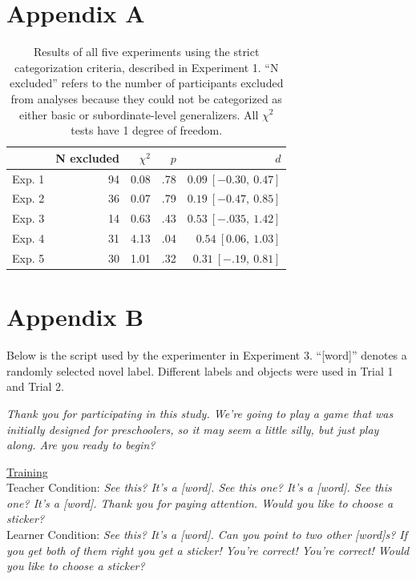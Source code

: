 \documentclass[man]{apa2}
\begin{document}
\section{Appendix A}

\begin{table}[h]
\centering
\begin{tabular}{rrrrr}
 \hline
 & N excluded & $\chi^2$ & $p$ & $d$ \\ 
 \hline
Exp. 1 & 94 & 0.08 & .78 & $0.09\ [-0.30,\ 0.47]$\\ 
Exp. 2 & 36 & 0.07 & .79 & $0.19\ [-0.47,\ 0.85]$ \\ 
Exp. 3 & 14 & 0.63 & .43 & $0.53\ [-.035,\ 1.42]$ \\ 
Exp. 4 & 31 & 4.13 & .04 & $0.54\ [0.06,\ 1.03]$\\ 
Exp. 5 & 30 & 1.01 & .32 & $0.31\ [-.19,\ 0.81]$\\ 
 \hline
\end{tabular}
\caption{Results of all five experiments using the strict categorization criteria, described in Experiment 1. ``N excluded'' refers to the number of participants excluded from analyses because they could not be categorized as either basic or subordinate-level generalizers. All $\chi^2$ tests have 1 degree of freedom. }
\label{strictResults}
\end{table}


\section{Appendix B}
Below is the script used by the experimenter in Experiment 3. ``[word]'' denotes a randomly selected novel label. Different labels and objects were used in Trial 1 and Trial 2. 

\vspace{5mm}

{\it Thank you for participating in this study. We're going to play a game that was initially designed for preschoolers, so it may seem a little silly, but just play along. Are you ready to begin?}
\vspace{2.5mm}

\noindent \underline{Training} \\
	Teacher Condition: {\it See this? It's a [word]. See this one? It's a [word]. See this one? It's a [word]. Thank you for paying attention. Would you like to choose a sticker? }
\\
Learner Condition: {\it See this? It's a [word]. Can you point to two other [word]s? If you get both of them right you get a sticker! You're correct! You're correct! Would you like to choose a sticker? }
\vspace{2.5mm}
 
\end{document}
